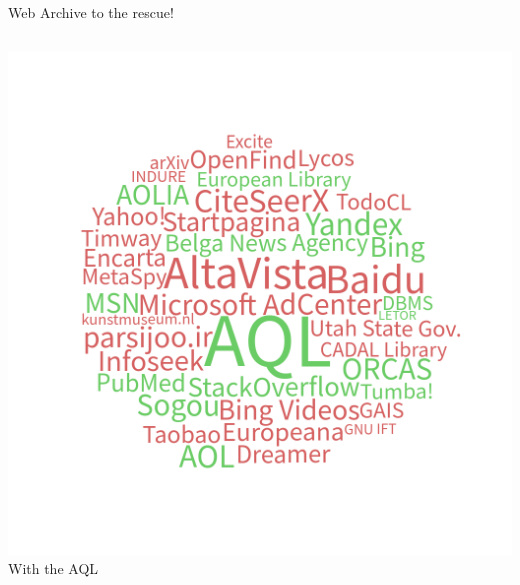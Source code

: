 \documentclass[english,xcolor=x11names]{beamer}
\begin{document}
\begin{frame}{Web Archive to the rescue!}
\begin{columns}
\begin{column}{0.45\linewidth}
\begin{center}
        \includegraphics[width=\linewidth]{wordcloud}\\
        With the AQL
        \vspace{5ex}
      \end{center}
    \end{column}
  \end{columns}
\end{frame}
\end{document}
